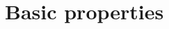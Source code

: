\documentclass[11pt]{book}
\numberwithin{equation}{section}
\numberwithin{theorem}{chapter}
\theoremstyle{definition}
\newtheorem{exercise}[theorem]{Exercise}
\newtheorem*{basic properties}{Basic Properties}
\newtheorem*{Important Remark}{Important Remark}
\theoremstyle{remark}
\newcommand{\NN}{\mathbb{N}}
\renewcommand{\H}{\operatorname{H}}
\begin{document}
\begin{comment}
	The second local cohomology of the same ideal is also nonzero. There are many nonzero elements, but I want to find some that are the ``biggest'' in some sense. Set $\nu_a={\left[\frac{v^{a-1}}{x^a y}\right]}=\left[\frac{v^{a-1} y^{a-1}}{x^a y^a}\right]$. We claim that each $\nu_a$ is nonzero in $\H^2_{(x,y)}(T)$. For this, we note that $T$ admits an $\NN^2$-grading: set the weights of $x,y,u,v$ to be
	\[ \begin{bmatrix} 1 \\ 0 \end{bmatrix} , \begin{bmatrix} 0 \\ 1 \end{bmatrix}, \begin{bmatrix} 0 \\ 1  \end{bmatrix}, \begin{bmatrix} 1 \\ 0 \end{bmatrix}, \]
	respectively; since the defining equation is homogeneous with respect to these weights, this gives a well-defined grading on $T$.
	
	Then, the degrees of the elements $(xy)^t (vy)^{a-1}$, $x^{t+a}$, and $y^{t+a}$ are,
		\[ \begin{bmatrix}
		t+a-1 \\ t+a-1  \end{bmatrix} , \begin{bmatrix} t+a \\ 0 \end{bmatrix}, \begin{bmatrix} 0 \\ t+a \end{bmatrix}, \]
		respectively, so by degree considerations, $(xy)^t (vy)^{a-1} \notin (x^{t+a}, y^{t+a})$, and hence each $\nu_a\neq 0$ in $\H^2_{(x,y)}(T)$.
\end{example}

\begin{exercise}
	Show that each $\nu_a$ is killed by the ideal $(x,y,u,v)$ in $T$, and conclude that the socle of $\H^2_{(x,y)}(T)$ is an infinite-dimensional vector space.
\end{exercise}

\end{comment}


\section{Basic properties}
\end{document}
